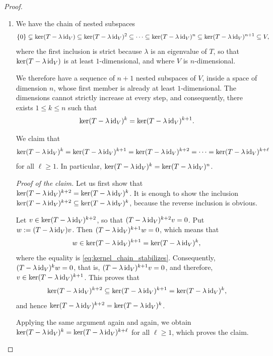 \begin{proof}
\begin{enumerate}[label=\textbf{(\alph*)}]
    \item We have the chain of nested subspaces
    \[
        \{0\} \subsetneq \ker(T - \lambda \operatorname{id}_V) \subseteq \ker(T - \lambda \operatorname{id}_V)^2 \subseteq \dots \subseteq \ker(T - \lambda \operatorname{id}_V)^n \subseteq \ker(T - \lambda \operatorname{id}_V)^{n+1} \subseteq V,
    \]
    where the first inclusion is strict because $\lambda$ is an eigenvalue of $T$, so that $\ker(T - \lambda \operatorname{id}_V)$ is at least $1$-di\-men\-sional, and where $V$ is $n$-di\-men\-sional.

    We therefore have a sequence of $n+1$ nested subspaces of $V$, inside a space of dimension $n$, whose first member is already at least $1$-di\-men\-sional. The dimensions cannot strictly increase at every step, and consequently, there exists $1 \le k \le n$ such that
    \begin{equation}
    \label{eq:kernel_chain_stabilizes}
        \ker(T - \lambda \operatorname{id}_V)^k = \ker(T - \lambda \operatorname{id}_V)^{k+1}.
    \end{equation}

    We claim that
    \[
        \ker(T - \lambda \operatorname{id}_V)^k = \ker(T - \lambda \operatorname{id}_V)^{k+1} = \ker(T - \lambda \operatorname{id}_V)^{k+2} = \dots = \ker(T - \lambda \operatorname{id}_V)^{k+\ell}
    \]
    for all $\ell \ge 1$. In particular, $\ker(T - \lambda \operatorname{id}_V)^k = \ker(T - \lambda \operatorname{id}_V)^n$.

    \textit{Proof of the claim.} Let us first show that $\ker(T - \lambda \operatorname{id}_V)^{k+2} = \ker(T - \lambda \operatorname{id}_V)^{k}$. It is enough to show the inclusion $\ker(T - \lambda \operatorname{id}_V)^{k+2} \subseteq \ker(T - \lambda \operatorname{id}_V)^{k}$, because the reverse inclusion is obvious.

    Let $v \in \ker(T - \lambda \operatorname{id}_V)^{k+2}$, so that $(T - \lambda \operatorname{id}_V)^{k+2} v = 0$. Put $w := (T - \lambda \operatorname{id}_V)v$. Then $(T - \lambda \operatorname{id}_V)^{k+1} w = 0$, which means that
    \[
        w \in \ker(T - \lambda \operatorname{id}_V)^{k+1} = \ker(T - \lambda \operatorname{id}_V)^{k},
    \]
    where the equality is \eqref{eq:kernel_chain_stabilizes}. Consequently, $(T - \lambda \operatorname{id}_V)^{k} w = 0$, that is, $(T - \lambda \operatorname{id}_V)^{k+1} v = 0$, and therefore, $v \in \ker(T - \lambda \operatorname{id}_V)^{k+1}$. This proves that
    \[
        \ker(T - \lambda \operatorname{id}_V)^{k+2} \subseteq \ker(T - \lambda \operatorname{id}_V)^{k+1} = \ker(T - \lambda \operatorname{id}_V)^{k},
    \]
    and hence $\ker(T - \lambda \operatorname{id}_V)^{k+2} = \ker(T - \lambda \operatorname{id}_V)^{k}$.

    Applying the same argument again and again, we obtain $\ker(T - \lambda \operatorname{id}_V)^{k} = \ker(T - \lambda \operatorname{id}_V)^{k+\ell}$ for all $\ell \ge 1$, which proves the claim.


\end{enumerate}
\end{proof}
